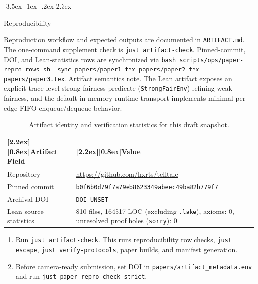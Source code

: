 \documentclass[a4paper,10pt,twocolumn,english]{article}
\makeatletter
\renewcommand{\section}{\@startsection{section}{1}{\z@}%
  {-3.5ex \@plus -1ex \@minus -.2ex}%
  {2.3ex}%
  {\raggedright\normalfont\large\bfseries}}
\numberwithin{equation}{section}
\theoremstyle{paperdef}
\theoremstyle{paperplain}
\theoremstyle{paperdef}
\theoremstyle{paperremark}
\newcommand{\thead}[1]{\textbf{\raisebox{0pt}[2.2ex][0.8ex]{#1}}}
\makeatother
\begin{document}
\section{Reproducibility}
\label{app:reproducibility}

Reproduction workflow and expected outputs are documented in
\texttt{ARTIFACT.md}. The one-command supplement check is
\texttt{just artifact-check}. Pinned-commit, DOI, and Lean-statistics rows are
synchronized via
\texttt{bash scripts/ops/paper-repro-rows.sh --sync papers/paper1.tex papers/paper2.tex papers/paper3.tex}.
Artifact semantics note. The Lean artifact exposes an explicit trace-level
strong fairness predicate (\texttt{StrongFairEnv}) refining weak fairness, and
the default in-memory runtime transport implements minimal per-edge FIFO
enqueue/dequeue behavior.

\begin{table}[H]
	\centering
	\footnotesize
	\begin{tabularx}{\columnwidth}{@{}L{0.34\columnwidth}L{0.61\columnwidth}@{}}
		\toprule
		\thead{Artifact Field} & \thead{Value}                                                                             \\
		\midrule
		Repository             & \url{https://github.com/hxrts/telltale}                                                   \\
		Pinned commit & \texttt{b0f6b0d79f7a79eb}\allowbreak\texttt{8623349abeec49ba}\allowbreak\texttt{82b779f7} \\
		Archival DOI & \texttt{DOI-UNSET} \\
		Lean source statistics & 810 files, 164517 LOC (excluding \texttt{.lake}), axioms: 0, unresolved proof holes (\texttt{sorry}): 0 \\
		\bottomrule
	\end{tabularx}
	\caption{Artifact identity and verification statistics for this draft snapshot.}
\end{table}

\begin{enumerate}
	\item Run \texttt{just artifact-check}. This runs reproducibility row checks, \texttt{just escape}, \texttt{just verify-protocols}, paper builds, and manifest generation.
	\item Before camera-ready submission, set DOI in \texttt{papers/artifact\_metadata.env} and run \texttt{just paper-repro-check-strict}.
\end{enumerate}
\end{document}
